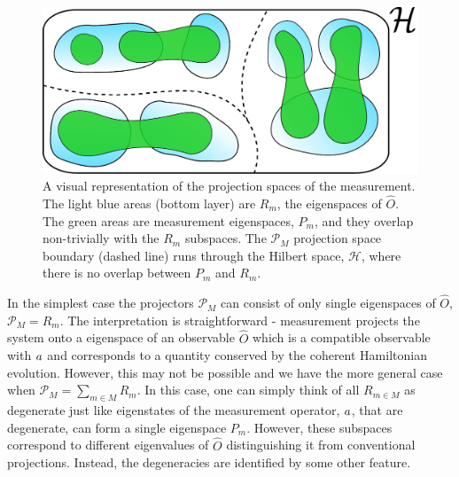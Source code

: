 \begin{figure}[hbtp!]
	\includegraphics[width=\linewidth]{spaces}
	\caption[A Visual Representation of the Projection Spaces of
        the Measurement]{A visual representation of the projection
          spaces of the measurement. The light blue areas (bottom
          layer) are $R_m$, the eigenspaces of $\hat{O}$. The green
          areas are measurement eigenspaces, $P_m$, and they overlap
          non-trivially with the $R_m$ subspaces. The $\mathcal{P}_M$
          projection space boundary (dashed line) runs through the
          Hilbert space, $\mathcal{H}$, where there is no overlap
          between $P_m$ and $R_m$.  \label{fig:spaces}}
\end{figure}

In the simplest case the projectors $\mathcal{P}_M$ can consist of
only single eigenspaces of $\hat{O}$, $\mathcal{P}_M = R_m$. The
interpretation is straightforward - measurement projects the system
onto a eigenspace of an observable $\hat{O}$ which is a compatible
observable with $a$ and corresponds to a quantity conserved by the
coherent Hamiltonian evolution. However, this may not be possible and
we have the more general case when
$\mathcal{P}_M = \sum_{m \in M} R_m$. In this case, one can simply
think of all $R_{m \in M}$ as degenerate just like eigenstates of the
measurement operator, $a$, that are degenerate, can form a single
eigenspace $P_m$. However, these subspaces correspond to different
eigenvalues of $\hat{O}$ distinguishing it from conventional
projections. Instead, the degeneracies are identified by some other
feature.

